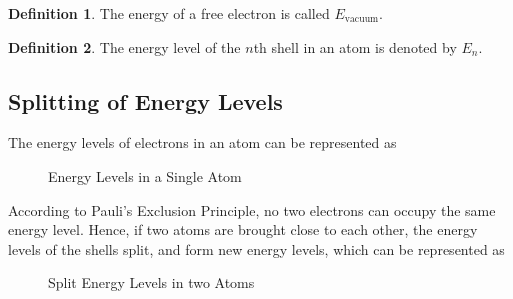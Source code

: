 \documentclass[titlepage, fleqn, a4paper, 12pt, twoside]{article}
\theoremstyle{definition}
\newtheorem{definition}{Definition}
\theoremstyle{theorem}
\let\Oldsubsection\subsection
\renewcommand{\subsection}{\FloatBarrier\Oldsubsection}
\begin{document}
\begin{definition}
	The energy of a free electron is called $E_{\text{vacuum}}$.
\end{definition}

\begin{definition}
	The energy level of the $n$th shell in an atom is denoted by $E_n$.
\end{definition}

\subsection{Splitting of Energy Levels}

The energy levels of electrons in an atom can be represented as
\begin{figure}[H]
	\centering
	\caption{Energy Levels in a Single Atom}
\end{figure}

According to Pauli's Exclusion Principle, no two electrons can occupy the same energy level.
Hence, if two atoms are brought close to each other, the energy levels of the shells split, and form new energy levels, which can be represented as
\begin{figure}[H]
	\centering
	\caption{Split Energy Levels in two Atoms}
\end{figure}
\end{document}
